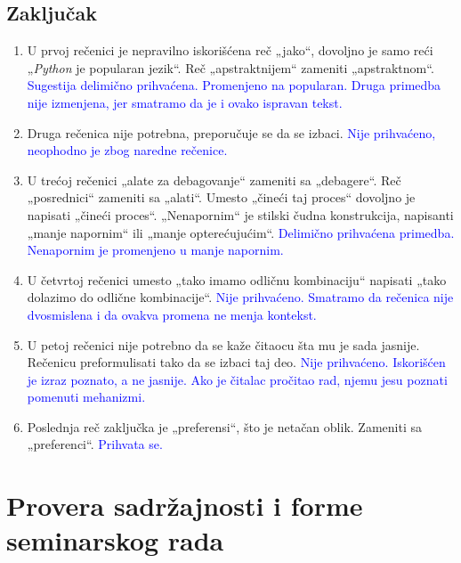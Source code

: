 \documentclass[a4paper]{report}
\newcommand{\odgovor}[1]{\textcolor{blue}{#1}}
\begin{document}
\subsection{Zaključak}
\begin{enumerate}
    \item U prvoj rečenici je nepravilno iskorišćena reč „jako“, dovoljno je samo reći „\emph{Python} je popularan jezik“. Reč „apstraktnijem“ zameniti „apstraktnom“.
    \odgovor{Sugestija delimično prihvaćena. Promenjeno na popularan. Druga primedba nije izmenjena, jer smatramo da je i ovako ispravan tekst.}
    \item Druga rečenica nije potrebna, preporučuje se da se izbaci.
    \odgovor{Nije prihvaćeno, neophodno je zbog naredne rečenice.}
    \item U trećoj rečenici „alate za debagovanje“ zameniti sa „debagere“. Reč „posrednici“ zameniti sa „alati“. Umesto „čineći taj proces“ dovoljno je napisati „čineći proces“. „Nenapornim“ je stilski čudna konstrukcija, napisanti „manje napornim“ ili „manje opterećujućim“.
    \odgovor{Delimično prihvaćena primedba. Nenapornim je promenjeno u manje napornim.}
    \item U četvrtoj rečenici umesto „tako imamo odličnu kombinaciju“ napisati „tako dolazimo do odlične kombinacije“.
    \odgovor{Nije prihvaćeno. Smatramo da rečenica nije dvosmislena i da ovakva promena ne menja kontekst.}
    \item U petoj rečenici nije potrebno da se kaže čitaocu šta mu je sada jasnije. Rečenicu preformulisati tako da se izbaci taj deo.
    \odgovor{Nije prihvaćeno. Iskorišćen je izraz poznato, a ne jasnije. Ako je čitalac pročitao rad, njemu jesu poznati pomenuti mehanizmi.}
    \item Poslednja reč zaključka je „preferensi“, što je netačan oblik. Zameniti sa „preferenci“.
    \odgovor{Prihvata se.}
\end{enumerate}

\section{Provera sadržajnosti i forme seminarskog rada}
\end{document}
